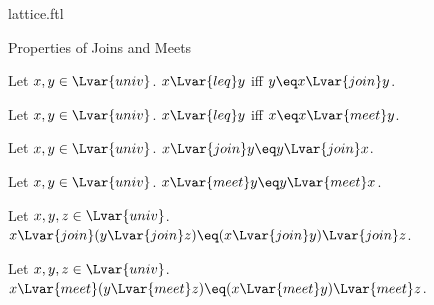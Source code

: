 \documentclass{naproche-library}
\begin{document}
\begin{smodule}[title=Lattices]{lattice.ftl}
\begin{sfragment}{Properties of Joins and Meets}
  \begin{proposition*}[forthel,id=PrecedingIffJoinEqualsLargerOperandThm]
    Let $x,y\in\Lvar{univ}$.
    $x{\Lvar{leq}}y$ iff $y\eq x{\Lvar{join}}y$.
  \end{proposition*}

  \begin{proposition*}[forthel,id=PrecedingIffMeetEqualsLargerOperandThm]
    Let $x,y\in\Lvar{univ}$.
    $x{\Lvar{leq}}y$ iff $x\eq x{\Lvar{meet}}y$.
  \end{proposition*}

  \begin{proposition*}[forthel,id=JoinIsCommutativeThm]
    Let $x,y\in\Lvar{univ}$.
    $x{\Lvar{join}}y\eq y{\Lvar{join}}x$.
  \end{proposition*}

  \begin{proposition*}[forthel,id=MeetIsCommutativeThm]
    Let $x,y\in\Lvar{univ}$.
    $x{\Lvar{meet}}y\eq y{\Lvar{meet}}x$.
  \end{proposition*}

  \begin{proposition*}[forthel,id=JoinIsAssociativeThm]
    Let $x,y,z\in\Lvar{univ}$.
    $x{\Lvar{join}}(y{\Lvar{join}}z)\eq (x{\Lvar{join}}y){\Lvar{join}}z$.
  \end{proposition*}

  \begin{proposition*}[forthel,id=MeetIsAssociativeThm]
    Let $x,y,z\in\Lvar{univ}$.
    $x{\Lvar{meet}}(y{\Lvar{meet}}z)\eq (x{\Lvar{meet}}y){\Lvar{meet}}z$.
  \end{proposition*}
\end{sfragment}
\end{smodule}
\end{document}
